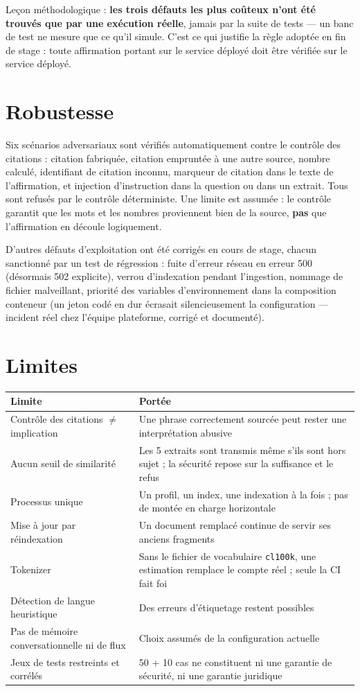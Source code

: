 \documentclass[a4paper,12pt]{report}
\begin{document}
Leçon méthodologique : \textbf{les trois défauts les plus coûteux n'ont été trouvés que par une
exécution réelle}, jamais par la suite de tests — un banc de test ne mesure que ce qu'il simule.
C'est ce qui justifie la règle adoptée en fin de stage : toute affirmation portant sur le service
déployé doit être vérifiée sur le service déployé.

\section{Robustesse}
Six scénarios adversariaux sont vérifiés automatiquement contre le contrôle des citations :
citation fabriquée, citation empruntée à une autre source, nombre calculé, identifiant de citation
inconnu, marqueur de citation dans le texte de l'affirmation, et injection d'instruction dans la
question ou dans un extrait. Tous sont refusés par le contrôle déterministe. Une limite est
assumée : le contrôle garantit que les mots et les nombres proviennent bien de la source, \textbf{pas}
que l'affirmation en découle logiquement.

D'autres défauts d'exploitation ont été corrigés en cours de stage, chacun sanctionné par un test de
régression : fuite d'erreur réseau en erreur 500 (désormais 502 explicite), verrou d'indexation
pendant l'ingestion, nommage de fichier malveillant, priorité des variables d'environnement dans la
composition conteneur (un jeton codé en dur écrasait silencieusement la configuration — incident
réel chez l'équipe plateforme, corrigé et documenté).

\section{Limites}
\begin{table}[H]
\centering
\small
\begin{tabular}{p{4.7cm}p{9.8cm}}
\toprule
\textbf{Limite} & \textbf{Portée} \\
\midrule
Contrôle des citations $\neq$ implication & Une phrase correctement sourcée peut rester une
interprétation abusive \\
Aucun seuil de similarité & Les 5 extraits sont transmis même s'ils sont hors sujet ; la sécurité
repose sur la suffisance et le refus \\
Processus unique & Un profil, un index, une indexation à la fois ; pas de montée en charge
horizontale \\
Mise à jour par réindexation & Un document remplacé continue de servir ses anciens fragments \\
Tokenizer & Sans le fichier de vocabulaire \texttt{cl100k}, une estimation remplace le compte réel ;
seule la CI fait foi \\
Détection de langue heuristique & Des erreurs d'étiquetage restent possibles \\
Pas de mémoire conversationnelle ni de flux & Choix assumés de la configuration actuelle \\
Jeux de tests restreints et corrélés & 50 + 10 cas ne constituent ni une garantie de sécurité, ni
une garantie juridique \\
\bottomrule
\end{tabular}
\end{table}
\end{document}
